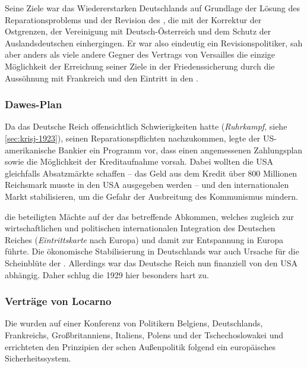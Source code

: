 Seine Ziele war das Wiedererstarken Deutschlands auf Grundlage der
Lösung des Reparationsproblems und der Revision des , die mit der Korrektur der
Ostgrenzen, der Vereinigung mit Deutsch-Österreich und dem Schutz der
Auslandsdeutschen einhergingen. Er war also eindeutig ein
Revisionspolitiker, sah aber anders als viele andere Gegner des
Vertrags von Versailles die einzige Möglichkeit der Erreichung seiner
Ziele in der Friedenssicherung durch die Aussöhnung mit Frankreich und
den Eintritt in den .

\subsubsection{Dawes-Plan}

Da das Deutsche Reich offensichtlich Schwierigkeiten hatte
(\emph{Ruhrkampf}, siehe \ref{sec:krisj-1923}),
seinen Reparationspflichten nachzukommen, legte der US-amerikanische
Bankier  ein Programm vor, dass
einen angemessenen Zahlungsplan sowie die Möglichkeit der
Kreditaufnahme vorsah. Dabei wollten die USA gleichfalls Absatzmärkte
schaffen -- das Geld aus dem Kredit über 800 Millionen Reichsmark
musste in den USA ausgegeben werden -- und den internationalen Markt
stabilisieren, um die Gefahr der Ausbreitung des Kommunismus mindern.

 die beteiligten Mächte auf der
 das betreffende Abkommen,
welches zugleich zur wirtschaftlichen und politischen internationalen
Integration des Deutschen Reiches (\emph{Eintrittskarte} nach Europa)
und damit zur Entspannung in Europa führte. Die ökonomische
Stabilisierung in Deutschlands war auch Ursache für die Scheinblüte der
.
Allerdings war das Deutsche Reich nun finanziell von den USA abhängig.
Daher schlug die  1929 hier besonders hart
zu.


\subsubsection{Verträge von Locarno}

Die  wurden  auf
einer Konferenz von Politikern Belgiens, Deutschlands, Frankreichs,
Großbritanniens, Italiens, Polens und der Tschechoslowakei
 und errichteten den Prinzipien der schen Außenpolitik folgend ein europäisches
Sicherheitssystem.

